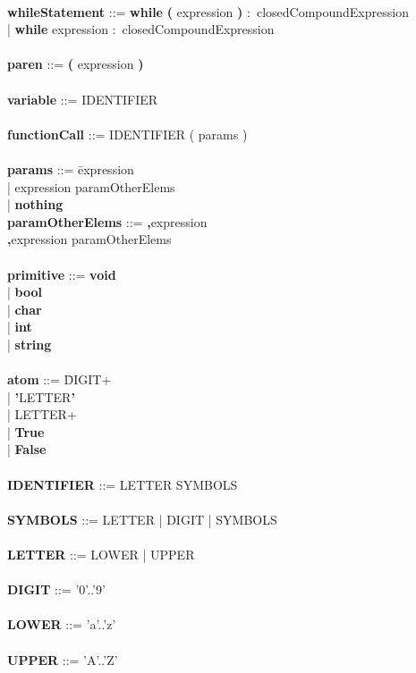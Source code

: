 \begin{tabbing}
\\
{\bf whileStatement}              ::= \=\textbf{while} \textbf{(} expression \textbf{)} $\colon$ closedCompoundExpression\\
                                      \>| \textbf{while} expression $\colon$ closedCompoundExpression\\
\\ 
{\bf paren}                       ::= \textbf{(} expression \textbf{)}\\
\\   
{\bf variable}                    ::= IDENTIFIER \\
\\   
{\bf functionCall}                ::= IDENTIFIER ( params ) \\
\\
{\bf params}                      ::= \=expression\\
                                      \>| expression paramOtherElems\\
                                      \>| \textbf{nothing}
\\
{\bf paramOtherElems}             ::= \=\textbf{,}expression\\
                                      \>\textbf{,}expression paramOtherElems\\
\\    
{\bf primitive}                   ::= \=\textbf{void}\\
                                      \>| \textbf{bool}\\
                                      \>| \textbf{char}\\
                                      \>| \textbf{int}\\
                                      \>| \textbf{string}\\
\\ 
{\bf atom}                        ::= \=DIGIT+\\
                                      \>| \textbf{'}LETTER\textbf{'}\\
                                      \>| LETTER+\\
                                      \>| \textbf{True}\\
                                      \>| \textbf{False}\\
\\
{\bf IDENTIFIER}                  ::= LETTER SYMBOLS\\
\\
{\bf SYMBOLS}                     ::= LETTER | DIGIT | SYMBOLS\\
\\
{\bf LETTER}                      ::= LOWER | UPPER\\
\\
{\bf DIGIT}                       ::= '0'..'9'\\
\\
{\bf LOWER}                       ::= 'a'..'z'\\
\\     
{\bf UPPER}                       ::= 'A'..'Z'\\
\\
\end{tabbing}

